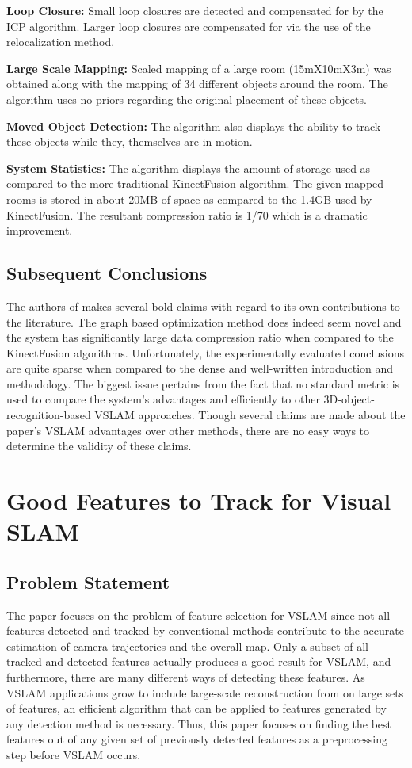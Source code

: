 \documentclass[10pt,twocolumn,letterpaper]{article}
\begin{document}
\textbf{Loop Closure:} Small loop closures are detected and compensated for by the ICP algorithm. Larger loop closures are compensated for via the use of the relocalization method. 

\textbf{Large Scale Mapping:} Scaled mapping of a large room (15mX10mX3m) was obtained along with the mapping of 34 different objects around the room. The algorithm uses no priors regarding the original placement of these objects.

\textbf{Moved Object Detection:} The algorithm also displays the ability to track these objects while they, themselves are in motion. 

\textbf{System Statistics:} The algorithm displays the amount of storage used as compared to the more traditional KinectFusion algorithm. The given mapped rooms is stored in about 20MB of space as compared to the 1.4GB used by KinectFusion. The resultant compression ratio is 1/70 which is a dramatic improvement. 

\subsection{Subsequent Conclusions}
The authors of \cite{Salas-Moreno_2013_CVPR} makes several bold claims with regard to its own contributions to the literature. The graph based optimization method does indeed seem novel and the system has significantly large data compression ratio when compared to the KinectFusion algorithms. Unfortunately, the experimentally evaluated conclusions are quite sparse when compared to the dense and well-written introduction and methodology. The biggest issue pertains from the fact that no standard metric is used to compare the system's advantages and efficiently to other 3D-object-recognition-based VSLAM approaches. Though several claims are made about the paper's VSLAM advantages over other methods, there are no easy ways to determine the validity of these claims.
\section {Good Features to Track for Visual SLAM}
\subsection{Problem Statement}
The paper \cite{Zhang_2015_CVPR} focuses on the problem of feature selection for VSLAM since not all features 
detected and tracked by conventional methods contribute to the accurate estimation of 
camera trajectories and the overall map. Only a subset of all tracked and detected features 
actually produces a good result for VSLAM, and furthermore, there are many different ways of
detecting these features. As VSLAM applications grow to include large-scale reconstruction from 
on large sets of features, an efficient algorithm that can be applied to features generated by any 
detection method is necessary. Thus, this paper focuses on finding the best features out of any given 
set of previously detected features as a preprocessing step before VSLAM occurs.
\end{document}
